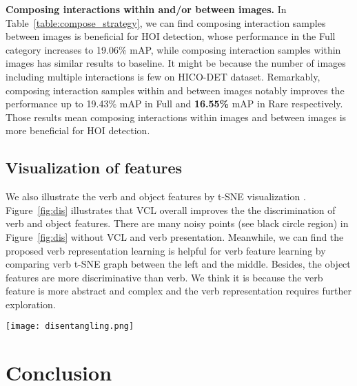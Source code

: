 \documentclass[runningheads]{llncs}
\begin{document}
{\bf Composing interactions within and/or between images.} In Table~\ref{table:compose_strategy}, we can find composing interaction samples between images is beneficial for HOI detection, whose performance in the Full category increases to 19.06\% mAP, while composing interaction samples within images has similar results to baseline. It might be because the number of images including multiple interactions is few on HICO-DET dataset.
Remarkably, composing interaction samples within and between images notably improves the performance up to 19.43\% mAP in Full and {\bf 16.55\%} mAP in Rare respectively. Those results mean composing interactions within images and between images is more beneficial for HOI detection.


\subsection{Visualization of features}
\label{sec:dis}

We also illustrate the verb and object features by t-SNE visualization \cite{maaten2008visualizing}.
Figure~\ref{fig:dis} illustrates that VCL overall improves the the discrimination of verb and object features. There are many noisy points (see black circle region) in Figure~\ref{fig:dis} without VCL and verb presentation. Meanwhile, we can find the proposed verb representation learning is helpful for verb feature learning by comparing verb t-SNE graph between the left and the middle. Besides, the object features are more discriminative than verb. We think it is because the verb feature is more abstract and complex and the verb representation requires further exploration.




 \begin{figure*}
 \begin{center}
\texttt{[image: disentangling.png]}
 \end{center}
    \caption{Visual illustration of object features (80 classes) (up) and verb features (117 classes) (bottom) on HICO-DET dataset (20000 samples) via t-SNE visualization \cite{maaten2008visualizing}. Left is the visual illustration of baseline, middle includes verb representation and the right uses both VCL and verb representation}
 \label{fig:dis}
 \end{figure*}


\section{Conclusion}
\end{document}
